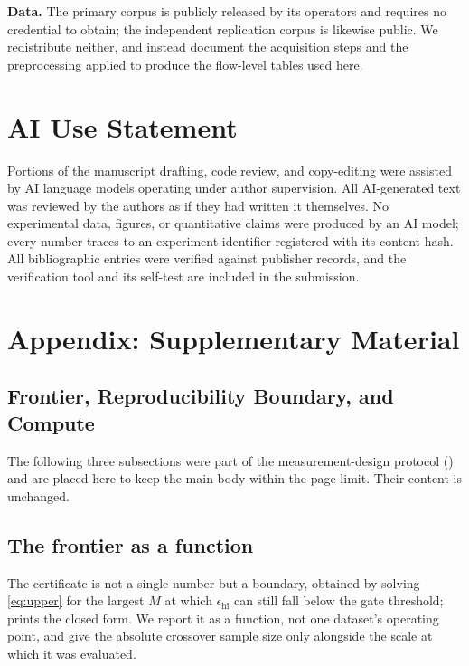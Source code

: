 \documentclass[sigconf,anonymous,review]{acmart}
\newcommand{\epshi}{\ensuremath{\epsilon_{\mathrm{hi}}}}
\begin{document}
\textbf{Data.}
The primary corpus is publicly released by its operators and requires no
credential to obtain; the independent replication corpus is likewise public. We
redistribute neither, and instead document the acquisition steps and the
preprocessing applied to produce the flow-level tables used here.



\endgroup%

\section*{AI Use Statement}

Portions of the manuscript drafting, code review, and copy-editing were assisted
by AI language models operating under author supervision. All AI-generated text
was reviewed by the authors as if they had written it themselves. No experimental
data, figures, or quantitative claims were produced by an AI model; every number
traces to an experiment identifier registered with its content hash. All
bibliographic entries were verified against publisher records, and the
verification tool and its self-test are included in the submission.

\clearpage
\section*{Appendix: Supplementary Material}

\setcounter{subsection}{0}
\renewcommand{\thesubsection}{A.\arabic{subsection}}


\subsection{Frontier, Reproducibility Boundary, and Compute}
\label{sec:appendix/design_detail}

The following three subsections were part of the measurement-design protocol
() and are placed here to keep the main body within the page
limit. Their content is unchanged.

\subsection{The frontier as a function}
\label{sec:design/frontier}

The certificate is not a single number but a boundary, obtained by solving
\eqref{eq:upper} for the largest $M$ at which $\epshi$ can still fall below the
gate threshold;  prints the closed form. We report it as a function,
not one dataset's operating point, and give the absolute crossover sample size
only alongside the scale at which it was evaluated.
\end{document}
